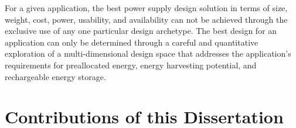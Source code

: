 %
%
%
%
%
%


For a given application, the best power supply design solution in terms of size, weight, cost, power, usability, and availability can not be achieved through the exclusive use of any one particular design archetype. The best design for an application can only be determined through a careful and quantitative exploration of a multi-dimensional design space that addresses the application's requirements for preallocated energy, energy harvesting potential, and rechargeable energy storage. 


\the\textwidth

\section{Contributions of this Dissertation}



